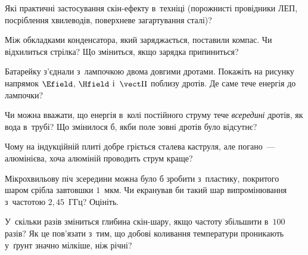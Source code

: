\begin{Questions}
\begin{quizlist}
		\item Які практичні застосування скін-ефекту в~техніці (порожнисті провідники ЛЕП, посріблення хвилеводів, поверхневе загартування сталі)?
		\item Між обкладками конденсатора, який заряджається, поставили компас. Чи відхилиться стрілка? Що зміниться, якщо зарядка припиниться?
		\item Батарейку з'єднали з~лампочкою двома довгими дротами. Покажіть на рисунку напрямок $\Efield$, $\Hfield$ і~$\vect\Pi$ поблизу дротів. Де саме тече енергія до лампочки?
		\item Чи можна вважати, що енергія в~колі постійного струму тече \emph{всередині} дротів, як вода в~трубі? Що змінилося б, якби поле зовні дротів було відсутнє?
		\item Чому на індукційній плиті добре гріється сталева каструля, але погано~--- алюмінієва, хоча алюміній проводить струм краще?
		\item Мікрохвильову піч зсередини можна було б зробити з~пластику, покритого шаром срібла завтовшки $1$~мкм. Чи екранував би такий шар випромінювання з~частотою $2{,}45$~ГГц? Оцініть.
		\item У~скільки разів зміниться глибина скін-шару, якщо частоту збільшити в~$100$ разів? Як це пов'язати з~тим, що добові коливання температури проникають у~ґрунт значно мілкіше, ніж річні?
	\end{quizlist}
\end{Questions}

